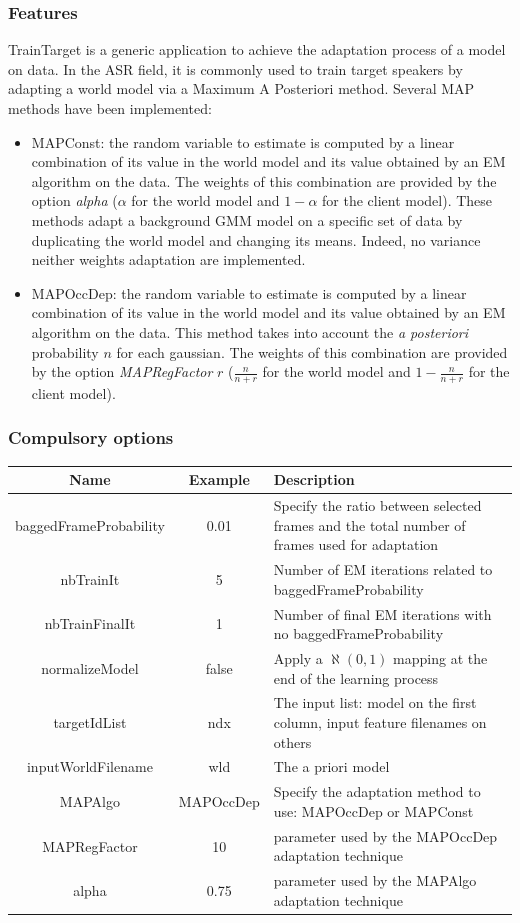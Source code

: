\documentclass[a4paper]{article}
\begin{document}
\subsubsection{Features}
TrainTarget is a generic application to achieve the adaptation
process of a model on data. In the ASR field, it is commonly used to
train target speakers by adapting a world model via a Maximum A
Posteriori method. Several MAP methods have been implemented:
\begin{itemize}
\item MAPConst: the random variable to estimate is computed by a linear combination of its value in the world model and its value obtained by an EM algorithm on the data. The weights of this combination are provided by the option \textit{alpha} ($\alpha$ for the world model and $1-\alpha$ for the client model).
These methods adapt a background GMM model on a specific set of data
by duplicating the world model and changing its means. Indeed, no
variance neither weights adaptation are implemented.
\item MAPOccDep: the random variable to estimate is computed by a linear combination of its value in the world model and its value obtained by an EM algorithm on the data. This method takes into account the \textit{a posteriori} probability $n$ for each gaussian. The weights of this combination are provided by the option \textit{MAPRegFactor} $r$ ($\frac{n}{n+r}$ for the world model and $1-\frac{n}{n+r}$ for the client model).
\end{itemize}

\subsubsection{Compulsory options}

\begin{tabular}{|c|c||p{8cm}|}
\hline Name & Example & Description\\
\hline
\hline baggedFrameProbability & 0.01 & Specify the ratio between selected frames and the total number of frames used for adaptation\\
\hline nbTrainIt & 5 & Number of EM iterations related to baggedFrameProbability\\
\hline nbTrainFinalIt & 1 & Number of final EM iterations with no baggedFrameProbability\\
\hline normalizeModel & false & Apply a $\aleph(0,1)$ mapping at the end of the learning process\\
\hline targetIdList & ndx & The input list: model on the first column, input feature filenames on others\\
\hline inputWorldFilename & wld & The a priori model\\
\hline MAPAlgo & MAPOccDep & Specify the adaptation method to use: MAPOccDep or MAPConst\\
\hline MAPRegFactor & 10 & parameter used by the MAPOccDep adaptation technique\\
\hline alpha &  0.75 & parameter used by the MAPAlgo adaptation technique \\
\hline
\end{tabular}
\end{document}
